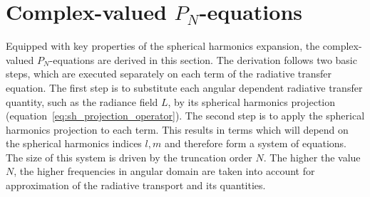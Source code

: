 \section{Complex-valued $P_N$-equations}
\label{sec:pn_cvalued}

Equipped with key properties of the spherical harmonics expansion, the complex-valued $P_N$-equations are derived in this section. The derivation follows two basic steps, which are executed separately on each term of the radiative transfer equation. The first step is to substitute each angular dependent radiative transfer quantity, such as the radiance field $L$, by its spherical harmonics projection (equation~\ref{eq:sh_projection_operator}). The second step is to apply the spherical harmonics projection to each term. This results in terms which will depend on the spherical harmonics indices $l,m$ and therefore form a system of equations. The size of this system is driven by the truncation order $N$. The higher the value $N$, the higher frequencies in angular domain are taken into account for approximation of the radiative transport and its quantities.

